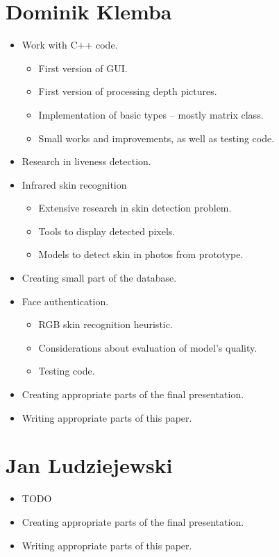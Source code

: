     \section{Dominik Klemba}
        \begin{itemize}
            \item Work with C++ code.
            \begin{itemize}
                \item First version of GUI.
                \item First version of processing depth pictures.
                \item Implementation of basic types -- mostly matrix class.
                \item Small works and improvements, as well as testing code.
            \end{itemize}
            \item Research in liveness detection.
            \item Infrared skin recognition
            \begin{itemize}
                \item Extensive research in skin detection problem.
                \item Tools to display detected pixels.
                \item Models to detect skin in photos from prototype.
            \end{itemize}
            \item Creating small part of the database.
            \item Face authentication.
            \begin{itemize}
                \item RGB skin recognition heuristic.
                \item Considerations about evaluation of model's quality.
                \item Testing code.
            \end{itemize}
            \item Creating appropriate parts of the final presentation.
            \item Writing appropriate parts of this paper.
        \end{itemize}

    \section{Jan Ludziejewski}
        \begin{itemize}
            \item TODO
            \item Creating appropriate parts of the final presentation.
            \item Writing appropriate parts of this paper.
        \end{itemize}

